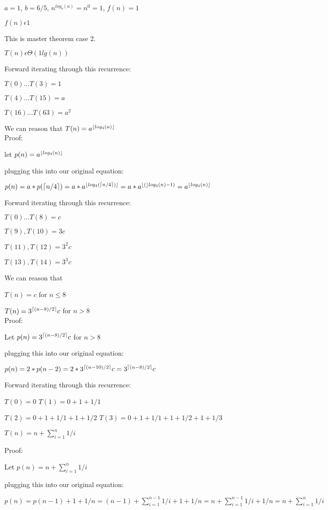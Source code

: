 \documentclass[12pt]{article}
\DeclarePairedDelimiter{\ceil}{\lceil}{\rceil}
\DeclarePairedDelimiter{\floor}{\lfloor}{\rfloor}
\newenvironment{question}[2][Question]{\begin{trivlist}
		\item[\hskip \labelsep {\bfseries #1}\hskip \labelsep {\bfseries #2.}]}{\end{trivlist}}
\begin{document}
\begin{question}{2e}
$a=1$, $b=6/5$, $n^{log_b(a)}=n^0=1$, $f(n)=1$

$f(n) \epsilon 1$

This is master theorem case 2.

$T(n) \epsilon \Theta(1 lg(n))$
\end{question}

\begin{question}{3a}
Forward iterating through this recurrence:

$T(0)...T(3)=1$

$T(4)...T(15)=a$

$T(16)...T(63)=a^2$

We can reason that $T(n)=a^{\floor{log_4(n)}}$\\

Proof:

let $p(n) = a^{\floor{log_4(n)}}$

plugging this into our original equation:

$p(n)=a*p(\ceil{n/4}) = a*a^{\floor{log_4(\ceil{n/4})}} = a*a^{\floor(log_4(n)-1)} =  a^{\floor{log_4(n)}}$
\end{question}

\begin{question}{3b}
Forward iterating through this recurrence:
	
	$T(0)...T(8) =c$
	
	$T(9), T(10) = 3c$
	
	$T(11), T(12) = 3^2c$
	
	$T(13), T(14) = 3^3c$
	
	We can reason that 
	
	$T(n)=c$ for $n\leq 8$
	
	$T(n)=3^{\ceil{(n-8)/2}}c$ for $n>8$\\
	
	Proof:
	
	Let $p(n)= 3^{\ceil{(n-8)/2}}c$ for $n>8$
	
	plugging this into our original equation:
	
	$p(n)=2*p(n-2) = 2*3^{\ceil{(n-10)/2}}c = 3^{\ceil{(n-8)/2}}c$
\end{question}

\begin{question}{3c}	
Forward iterating through this recurrence:

$T(0)=0$
$T(1)=0 + 1 + 1/1$

$T(2)=0 + 1 + 1/1 +1 + 1/2$
$T(3)=0 + 1 + 1/1 +1 + 1/2 +1 + 1/3$

$T(n)=n + \sum_{i=1}^{n}1/i$



	Proof:

Let $p(n)= n + \sum_{i=1}^{n}1/i$

plugging this into our original equation:

$p(n)=p(n-1)+1+1/n= (n-1) + \sum_{i=1}^{n-1}1/i + 1 + 1/n = n + \sum_{i=1}^{n-1}1/i + 1/n = n+ \sum_{i=1}^{n}1/i$


\end{question}
\end{document}
